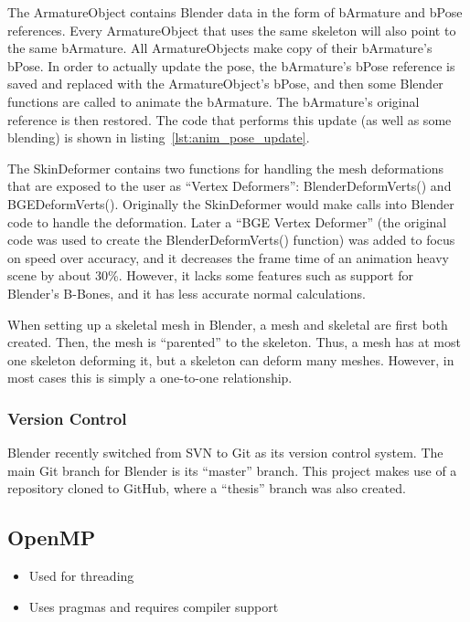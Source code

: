 The ArmatureObject contains Blender data in the form of bArmature and bPose references.
Every ArmatureObject that uses the same skeleton will also point to the same bArmature.
All ArmatureObjects make copy of their bArmature's bPose.
In order to actually update the pose, the bArmature's bPose reference is saved and replaced with the ArmatureObject's bPose, and then some Blender functions are called to animate the bArmature.
The bArmature's original reference is then restored.
The code that performs this update (as well as some blending) is shown in listing~\ref{lst:anim_pose_update}.


The SkinDeformer contains two functions for handling the mesh deformations that are exposed to the user as ``Vertex Deformers'': BlenderDeformVerts() and BGEDeformVerts().
Originally the SkinDeformer would make calls into Blender code to handle the deformation.
Later a ``BGE Vertex Deformer'' (the original code was used to create the BlenderDeformVerts() function) was added to focus on speed over accuracy, and it decreases the frame time of an animation heavy scene by about 30\%.
However, it lacks some features such as support for Blender's B-Bones, and it has less accurate normal calculations.

When setting up a skeletal mesh in Blender, a mesh and skeletal are first both created.
Then, the mesh is ``parented'' to the skeleton.
Thus, a mesh has at most one skeleton deforming it, but a skeleton can deform many meshes.
However, in most cases this is simply a one-to-one relationship.

\subsubsection{Version Control}

Blender recently switched from SVN to Git\cite{git} as its version control system\cite{blendergit}.
The main Git branch for Blender is its ``master'' branch.
This project makes use of a repository cloned to GitHub\cite{github}, where a ``thesis'' branch was also created.

\subsection{OpenMP}
\ifsummaries
\begin{itemize}
 \item Used for threading
 \item Uses pragmas and requires compiler support
\end{itemize}
\fi

